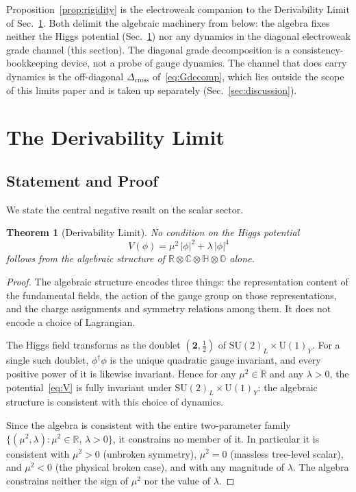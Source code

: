 \documentclass[12pt]{article}
\newtheorem{theorem}{Theorem}[section]
\theoremstyle{remark}
\newcommand{\su}{\mathrm{SU}}
\newcommand{\UU}{\mathrm{U}}
\newcommand{\R}{\mathbb{R}}
\newcommand{\Cplx}{\mathbb{C}}
\newcommand{\HH}{\mathbb{H}}
\newcommand{\OO}{\mathbb{O}}
\newcommand{\Dix}{\R\otimes\Cplx\otimes\HH\otimes\OO}
\newcommand{\half}{\tfrac{1}{2}}
\begin{document}
Proposition~\ref{prop:rigidity} is the electroweak companion to the Derivability
Limit of Sec.~\ref{sec:deriv}.  Both delimit the algebraic machinery from below:
the algebra fixes neither the Higgs potential (Sec.~\ref{sec:deriv}) nor any
dynamics in the diagonal electroweak grade channel (this section).  The diagonal
grade decomposition is a consistency-bookkeeping device, not a probe of gauge
dynamics.  The channel that does carry dynamics is the off-diagonal
$\Delta_{\mathrm{cross}}$ of~\eqref{eq:Gdecomp}, which lies outside the scope of
this limits paper and is taken up separately (Sec.~\ref{sec:discussion}).

\section{The Derivability Limit}
\label{sec:deriv}

\subsection{Statement and Proof}
\label{sec:deriv-thm}

We state the central negative result on the scalar sector.

\begin{theorem}[Derivability Limit]
	\label{thm:deriv}
	No condition on the Higgs potential
	\begin{equation}
		V(\phi) = \mu^2\,|\phi|^2 + \lambda\,|\phi|^4
		\label{eq:V}
	\end{equation}
	follows from the algebraic structure of $\Dix$ alone.
\end{theorem}

\begin{proof}
	The algebraic structure encodes three things: the representation content of
	the fundamental fields, the action of the gauge group on those
	representations, and the charge assignments and symmetry relations among
	them.  It does not encode a choice of Lagrangian.

	The Higgs field transforms as the doublet $(\mathbf{2},\half)$ of
	$\su(2)_L\times\UU(1)_Y$.  For a single such doublet, $\phi^\dagger\phi$ is
	the unique quadratic gauge invariant, and every positive power of it is
	likewise invariant.  Hence for any $\mu^2\in\R$ and any $\lambda>0$, the
	potential~\eqref{eq:V} is fully invariant under $\su(2)_L\times\UU(1)_Y$:
	the algebraic structure is consistent with this choice of dynamics.

	Since the algebra is consistent with the entire two-parameter family
	$\{(\mu^2,\lambda):\mu^2\in\R,\,\lambda>0\}$, it constrains no member of it.
	In particular it is consistent with $\mu^2>0$ (unbroken symmetry),
	$\mu^2=0$ (massless tree-level scalar), and $\mu^2<0$ (the physical broken
	case), and with any magnitude of $\lambda$.  The algebra constrains neither
	the sign of $\mu^2$ nor the value of $\lambda$.
\end{proof}
\end{document}

